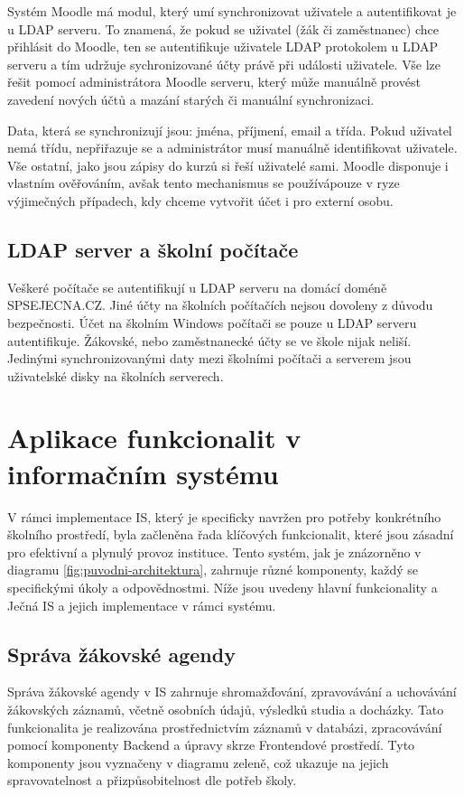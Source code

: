 \documentclass[FM,Proj]{tulthesis}
\begin{document}
Systém Moodle má modul, který umí synchronizovat uživatele a autentifikovat je u LDAP serveru.
To znamená, že pokud se uživatel (žák či zaměstnanec) chce přihlásit do Moodle, ten se 
autentifikuje uživatele LDAP protokolem u LDAP serveru a tím udržuje sychronizované účty právě
při události uživatele.
Vše lze řešit pomocí administrátora Moodle serveru, který může manuálně provést zavedení 
nových účtů a mazání starých či manuální synchronizaci.

Data, která se synchronizují jsou: jména, příjmení, email a třída. Pokud uživatel nemá třídu,
nepřiřazuje se a administrátor musí manuálně identifikovat uživatele. Vše ostatní, jako jsou 
zápisy do kurzů si řeší uživatelé sami. Moodle disponuje i vlastním ověřováním, avšak tento
mechanismus se používápouze  v ryze výjimečných případech, kdy chceme vytvořit účet i pro 
externí osobu.

\subsection{LDAP server a školní počítače}
\label{section:ldap-server-a-skolni-pocitace}
Veškeré počítače se autentifikují u LDAP serveru na domácí doméně SPSEJECNA.CZ. Jiné účty
na školních počítačích nejsou dovoleny z důvodu bezpečnosti.
Účet na školním Windows počítači se pouze u LDAP serveru autentifikuje. Žákovské, nebo
zaměstnanecké účty se ve škole nijak neliší. Jedinými synchronizovanými daty mezi školními
počítači a serverem jsou uživatelské disky na školních serverech.

\section{Aplikace funkcionalit v informačním systému}
V rámci implementace IS, který je specificky navržen pro potřeby konkrétního školního prostředí,
byla začleněna řada klíčových funkcionalit, které jsou zásadní pro efektivní a plynulý provoz
instituce. Tento systém, jak je znázorněno v diagramu \ref{fig:puvodni-architektura},
zahrnuje různé komponenty, každý se specifickými úkoly a odpovědnostmi. Níže jsou uvedeny
hlavní funkcionality a Ječná IS a jejich implementace v rámci systému.

\subsection*{Správa žákovské agendy}
Správa žákovské agendy v IS zahrnuje shromažďování, zpravovávání a uchovávání žákovských
záznamů, včetně osobních údajů, výsledků studia a docházky. Tato funkcionalita je realizována
prostřednictvím záznamů v databázi, zpracovávání pomocí komponenty Backend a úpravy skrze
Frontendové prostředí. Tyto komponenty jsou vyznačeny v diagramu zeleně, což ukazuje na jejich
spravovatelnost a přizpůsobitelnost dle potřeb školy.
\end{document}
